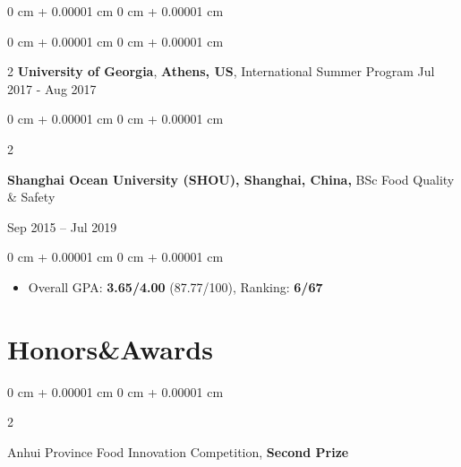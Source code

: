 \documentclass[10pt, letterpaper]{article}
\newenvironment{highlights}{
    \begin{itemize}[
        topsep=0.10 cm,
        parsep=0.10 cm,
        partopsep=0pt,
        itemsep=0pt,
        leftmargin=0 cm + 10pt
    ]
}{
    \end{itemize}
} %
\newenvironment{onecolentry}{
    \begin{adjustwidth}{
        0 cm + 0.00001 cm
    }{
        0 cm + 0.00001 cm
    }
}{
    \end{adjustwidth}
} %
\newenvironment{twocolentry}[2][]{
    \onecolentry
    \def\secondColumn{#2}
    \setcolumnwidth{\fill, 4.5 cm}
    \begin{paracol}{2}
}{
    \switchcolumn \raggedleft \secondColumn
    \end{paracol}
    \endonecolentry
} %
\newenvironment{header}{
    \setlength{\topsep}{0pt}\par\kern\topsep\centering\linespread{1}
}{
    \par\kern\topsep
} %
\begin{document}
\begin{header}
\begin{onecolentry}
\begin{highlights}
            \end{highlights}
            
        \end{onecolentry}
   \begin{twocolentry}{
            Jul 2017 - Aug 2017 } \textbf{University of Georgia}, \textbf{Athens, US}, International Summer Program\end{twocolentry}
        \begin{twocolentry}{
        Sep 2015 – Jul 2019
        }
            \textbf{Shanghai Ocean University (SHOU), Shanghai, China, }BSc Food Quality \& Safety
        \end{twocolentry}
    \vspace{0.10 cm}
    \begin{onecolentry}
        \begin{highlights}
        
            \item Overall GPA: \textbf{3.65/4.00} (87.77/100), Ranking: \textbf{6/67}
           
        \end{highlights}
         
    \end{onecolentry}
    \begin{comment}
      
  
  \begin{onecolentry}
    
         
    
      \textbf{Core courses}: Sensory Evaluation of Food, Food Quality Inspection, Risk assessment of Food Safety, Food Microbiology, Biochemistry, Nutritional Epidemiology and Dietary Research Methods (STAT).
       
  \end{onecolentry}
    \end{comment}
  
\section{Honors\&Awards}

    \begin{twocolentry}
        {2020}
        Anhui Province Food Innovation Competition, \textbf{Second Prize}
       

\end{twocolentry}
\end{header}
\end{document}
